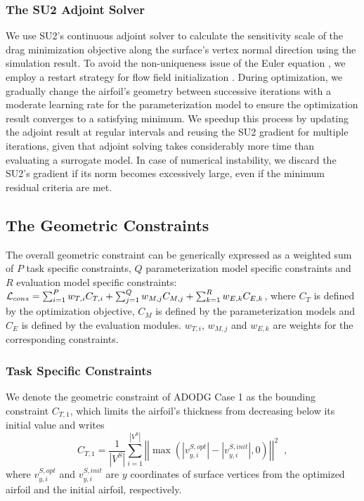 \subsubsection{The SU2 Adjoint Solver}
We use SU2's continuous adjoint solver to calculate the sensitivity scale of the drag minimization objective along the surface's vertex normal direction using the simulation result. To avoid the non-uniqueness issue of the Euler equation \cite{aa.Masters2017,aa.LeDoux2015}, we employ a restart strategy for flow field initialization \cite{aa.He2019}. During optimization, we gradually change the airfoil's geometry between successive iterations with a moderate learning rate for the parameterization model to ensure the optimization result converges to a satisfying minimum. We speedup this process by updating the adjoint result at regular intervals and reusing the SU2 gradient for multiple iterations, given that adjoint solving takes considerably more time than evaluating a surrogate model. In case of numerical instability, we discard the SU2's gradient if its norm becomes excessively large, even if the minimum residual criteria are met.

\subsection{The Geometric Constraints}
The overall geometric constraint can be generically expressed as a weighted sum of $P$ task specific constraints, $Q$ parameterization model specific constraints and $R$ evaluation model specific constraints: $\mathcal{L}_{cons} = \sum_{i=1}^P w_{T,i}C_{T,i} + \sum_{j=1}^Q w_{M,j}C_{M,j} + \sum_{k=1}^R w_{E,k}C_{E,k}$, where $C_T$ is defined by the optimization objective, $C_M$ is defined by the parameterization models and $C_E$ is defined by the evaluation modules. $w_{T,i}$, $w_{M,j}$ and $w_{E,k}$ are weights for the corresponding constraints.

\subsubsection{Task Specific Constraints}
We denote the geometric constraint of ADODG Case 1 as the bounding constraint $C_{T,1}$, which limits the airfoil’s thickness from decreasing below its initial value and writes
\begin{equation}
    {C_{T,1}} = \frac{1}{{|{V^S}|}}\sum\limits_{i = 1}^{|{V^S}|} \left|\left|{\max (|{v}_{y,i}^{S,opt}| - |{v}_{y,i}^{S,init}|,0)}\right|\right|^2\;\;,
\end{equation}
where ${v}_{y,i}^{S,opt}$ and ${v}_{y,i}^{S,init}$ are $y$ coordinates of surface vertices from the optimized airfoil and the initial airfoil, respectively.

